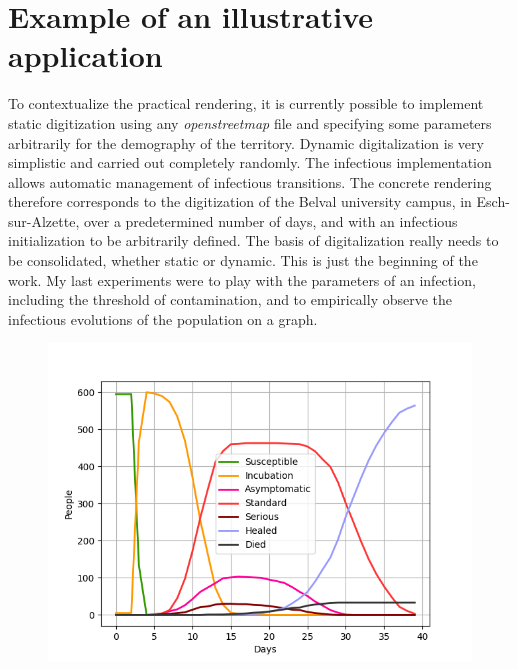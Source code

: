 \chapter{Example of an illustrative application}

 To contextualize the practical rendering, it is currently possible to implement static digitization using any \textit{openstreetmap} file and specifying some parameters arbitrarily for the demography of the territory. Dynamic digitalization is very simplistic and carried out completely randomly. The infectious implementation allows automatic management of infectious transitions. The concrete rendering therefore corresponds to the digitization of the Belval university campus, in Esch-sur-Alzette, over a predetermined number of days, and with an infectious initialization to be arbitrarily defined. The basis of digitalization really needs to be consolidated, whether static or dynamic. This is just the beginning of the work. My last experiments were to play with the parameters of an infection, including the threshold of contamination, and to empirically observe the infectious evolutions of the population on a graph.\\

\pagebreak

\begin{figure}[h]
  \centering
  \includegraphics[width=\linewidth]{media/experimentation_belval.png}
  \caption{}
  \label{fig:experimentationbelval}
\end{figure}

